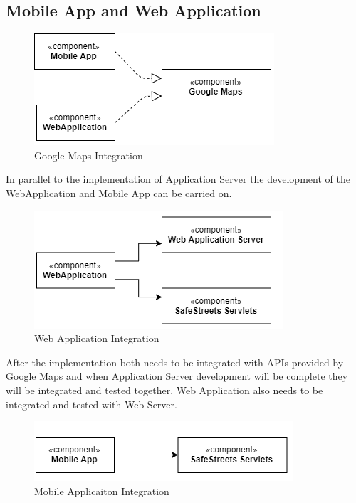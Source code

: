 \subsection{Mobile App and Web Application}
\begin{figure}[H]
\centering
\includegraphics{Images/IntegrationMaps.png}
\caption{\label{fig:ComWI}Google Maps Integration}
\end{figure}
In parallel to the implementation of Application Server the development of the WebApplication and
Mobile App can be carried on.
\begin{figure}[H]
\centering
\includegraphics{Images/IntegrationWeb.png}
\caption{\label{fig:ComWI}Web Application Integration}
\end{figure}
After the implementation both needs to be integrated with APIs provided by Google Maps and when
Application Server development will be complete they will be integrated and tested together. Web Application also needs to be integrated and tested with Web Server.

\begin{figure}[H]
\centering
\includegraphics{Images/IntegrationMobile.png}
\caption{\label{fig:ComWI}Mobile Applicaiton Integration}
\end{figure}
\newpage

